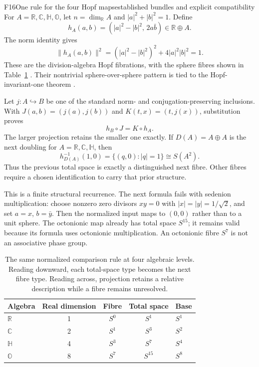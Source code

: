 \documentclass[11pt,a4paper]{article}
\newcommand{\R}{\mathbb{R}}
\newcommand{\C}{\mathbb{C}}
\newcommand{\HH}{\mathbb{H}}
\newcommand{\OO}{\mathbb{O}}
\begin{document}
\begin{formal}{F16}{One rule for the four Hopf maps}{established bundles and explicit compatibility}
For $A=\R,\C,\HH,\OO$, let $n=\dim_\R A$ and
$|a|^2+|b|^2=1$. Define
\begin{equation}\label{eq:hopf}
 h_A(a,b)=(|a|^2-|b|^2,\,2a\bar b)\in\R\oplus A.
\end{equation}
The norm identity gives
\begin{equation}
 \|h_A(a,b)\|^2=(|a|^2-|b|^2)^2+4|a|^2|b|^2=1.
\end{equation}
These are the division-algebra Hopf fibrations, with the sphere fibres shown
in Table~\ref{tab:hopf} \citep{Baez2002}. Their nontrivial sphere-over-sphere
pattern is tied to the Hopf-invariant-one theorem \citep{Adams1960}.

Let $j:A\hookrightarrow B$ be one of the standard norm- and
conjugation-preserving inclusions. With
$J(a,b)=(j(a),j(b))$ and $K(t,x)=(t,j(x))$, substitution proves
\begin{equation}\label{eq:hopf-compatibility}
 h_B\circ J=K\circ h_A.
\end{equation}
The larger projection retains the smaller one exactly. If $D(A)=A\oplus A$
is the next doubling for $A=\R,\C,\HH$, then
\begin{equation}
 h_{D(A)}^{-1}(1,0)=\{(q,0):|q|=1\}\cong S(A^2).
\end{equation}
Thus the previous total space is exactly a distinguished next fibre. Other
fibres require a chosen identification to carry that prior structure.

This is a finite structural recurrence. The next formula fails with sedenion
multiplication: choose nonzero zero divisors $xy=0$ with
$|x|=|y|=1/\sqrt2$, and set $a=x$, $b=\bar y$. Then the normalized input
maps to $(0,0)$ rather than to a unit sphere. The octonionic map already has
total space $S^{15}$; it remains valid because its formula uses octonionic
multiplication. An octonionic fibre $S^7$ is not an associative phase group.
\end{formal}

\begin{table}[htbp]
\centering
\begin{tabular}{@{}lcccl@{}}
\toprule
Algebra & Real dimension & Fibre & Total space & Base\\
\midrule
$\R$ & 1 & $S^0$ & $S^1$ & $S^1$\\
$\C$ & 2 & $S^1$ & $S^3$ & $S^2$\\
$\HH$ & 4 & $S^3$ & $S^7$ & $S^4$\\
$\OO$ & 8 & $S^7$ & $S^{15}$ & $S^8$\\
\bottomrule
\end{tabular}
\caption{The same normalized comparison rule at four algebraic levels. Reading
downward, each total-space type becomes the next fibre type. Reading across,
projection retains a relative description while a fibre remains unresolved.}
\label{tab:hopf}
\end{table}
\end{document}
